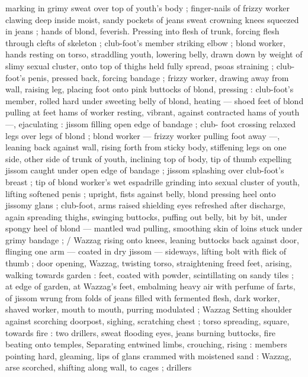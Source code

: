 marking in grimy sweat over top of youth's body ; finger-nails of 
frizzy worker clawing deep inside moist, sandy pockets of jeans 
sweat crowning knees squeezed in jeans ; hands of blond, feverish. 
Pressing into flesh of trunk, forcing flesh through clefts of skeleton 
; club-foot's member striking elbow ; blond worker, hands resting on 
torso, straddling youth, lowering belly, drawn down by weight of 
slimy sexual cluster, onto top of thighs held fully spread, psoas 
straining ; club-foot's penis, pressed back, forcing bandage ; frizzy 
worker, drawing away from wall, raising leg, placing foot onto pink 
buttocks of blond, pressing : club-foot's member, rolled hard under 
sweeting belly of blond, heating --- shoed feet of blond pulling at 
feet hams of worker resting, vibrant, against contracted hams of 
youth ---, ejaculating : jissom filling open edge of bandage ; club- 
foot crossing relaxed legs over legs of blond ; blond worker --- frizzy 
worker pulling foot away ---, leaning back against wall, rising forth 
from sticky body, stiffening legs on one side, other side of trunk of 
youth, inclining top of body, tip of thumb expelling jissom caught 
under open edge of bandage ; jissom splashing over club-foot's 
breast ; tip of blond worker's wet espadrille grinding into sexual 
cluster of youth, lifting softened penis ; upright, fists against belly, 
blond pressing heel onto jissomy glans ; club-foot, arms raised 
shielding eyes refreshed after discharge, again spreading thighs, 
swinging buttocks, puffing out belly, bit by bit, under spongy heel of 
blond --- mantled wad pulling, smoothing skin of loins stuck under 
grimy bandage ; {\slash} Wazzag rising onto knees, leaning buttocks back 
against door, flinging one arm --- coated in dry jissom --- sideways, 
lifting bolt with flick of thumb ; door opening, Wazzag, twisting torso, 
straightening freed feet, arising, walking towards garden : feet, 
coated with powder, scintillating on sandy tiles ; at edge of garden, 
at Wazzag's feet, embalming heavy air with perfume of farts, of 
jissom wrung from folds of jeans filled with fermented flesh, dark 
worker, shaved worker, mouth to mouth, purring modulated ; Wazzag 
Setting shoulder against scorching doorpost, sighing, scratching 
chest ; torso spreading, square, towards fire : two drillers, sweat 
flooding eyes, jeans burning buttocks, fire beating onto temples, 
Separating entwined limbs, crouching, rising : members pointing 
hard, gleaming, lips of glans crammed with moistened sand : 
Wazzag, arse scorched, shifting along wall, to cages ; drillers 
